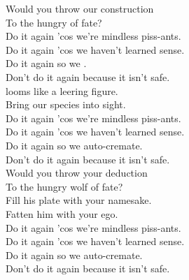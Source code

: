 



Would you throw our construction \\
To the hungry  of fate? \\

Do it again 'cos we're mindless piss-ants. \\
Do it again 'cos we haven't learned sense. \\
Do it again so we . \\
Don't do it again because it isn't safe. \\

 looms like a leering figure. \\
Bring our species into sight. \\

Do it again 'cos we're mindless piss-ants. \\
Do it again 'cos we haven't learned sense. \\
Do it again so we auto-cremate. \\
Don't do it again because it isn't safe. \\

Would you throw your deduction \\
To the hungry wolf of fate? \\
Fill his plate with your namesake. \\
Fatten him with your ego. \\

Do it again 'cos we're mindless piss-ants. \\
Do it again 'cos we haven't learned sense. \\
Do it again so we auto-cremate. \\
Don't do it again because it isn't safe. \\
